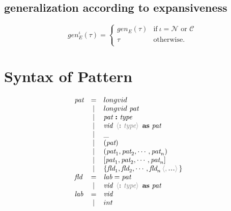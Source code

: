 \documentclass[11pt,a4paper]{article}
\newcommand{\key}[1]{\textrm{\textbf{#1}}}
\newcommand{\prodlhs}[1]{\textit{#1}}
\newcommand{\braced}[1]{\{#1\}}
\newcommand{\angled}[1]{\,{\color{gray}\langle#1\rangle}\,}
\newcommand{\xpc}{\mathcal{C}}
\newcommand{\nxp}{\mathcal{N}}
\begin{document}
\subsection {generalization according to expansiveness}
\[ 
	gen_E^\iota(\tau) = \left\{\begin{array}{cl}
						gen_E(\tau)	& \textrm{if}\ \iota = \nxp \textrm{ or } \xpc \\
						\tau		& \textrm{otherwise.}				\\
						\end{array}\right.
\]

\section {Syntax of Pattern}
{\renewcommand{\arraystretch}{1.2}\[
\begin{array}{lcll}
\prodlhs{pat}
    & = & longvid                                                                   &\\        
    & | & longvid \ \prodlhs{pat}                                                   &\\
    & | & \prodlhs{pat}\ \key{:}\ \prodlhs{type}                                    &\\
    & | & \prodlhs{vid}\ \angled{\key{:}\ \prodlhs{type}}\ \key{as}\ \prodlhs{pat}  &\\
    & | & \_                                                                        &\\
    & | & (\prodlhs{pat})                                                           &\\
    & | & (\prodlhs{pat}_1,\prodlhs{pat}_2,\cdots,\prodlhs{pat}_n)                  &\\
    & | & [\prodlhs{pat}_1,\prodlhs{pat}_2,\cdots,\prodlhs{pat}_n]                  &\\
    & | & \braced{\prodlhs{fld}_1,\prodlhs{fld}_2,\cdots,\prodlhs{fld}_n\angled{,\key{...}}}  &\\
\prodlhs{fld}
    & = & \prodlhs{lab} = \prodlhs{pat}                                             &\\
    & | & \prodlhs{vid}\ \angled{\key{:}\ \prodlhs{type}}\ \key{as}\ \prodlhs{pat}  &\\
\prodlhs{lab}
    & = & \prodlhs{vid}                                                             &\\
    & | & int                                                                       &\\
    
\end{array}
\]}
\end{document}
